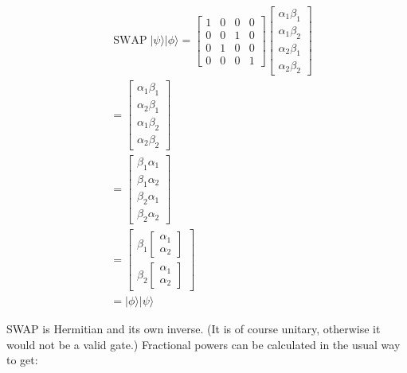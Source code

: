 \documentclass[main.tex]{subfiles}
\begin{document}
    $$
    \begin{aligned}
    &\operatorname{SWAP}|\psi\rangle|\phi\rangle=\left[\begin{array}{cccc}
    1 & 0 & 0 & 0 \\
    0 & 0 & 1 & 0 \\
    0 & 1 & 0 & 0 \\
    0 & 0 & 0 & 1
    \end{array}\right]\left[\begin{array}{l}
    \alpha_{1} \beta_{1} \\
    \alpha_{1} \beta_{2} \\
    \alpha_{2} \beta_{1} \\
    \alpha_{2} \beta_{2}
    \end{array}\right]\\
    &=\left[\begin{array}{c}
    \alpha_{1} \beta_{1} \\
    \alpha_{2} \beta_{1} \\
    \alpha_{1} \beta_{2} \\
    \alpha_{2} \beta_{2}
    \end{array}\right]\\
    &=\left[\begin{array}{l}
    \beta_{1} \alpha_{1} \\
    \beta_{1} \alpha_{2} \\
    \beta_{2} \alpha_{1} \\
    \beta_{2} \alpha_{2}
    \end{array}\right]\\
    &=\left[\begin{array}{l}
    \beta_{1}\left[\begin{array}{l}
    \alpha_{1} \\
    \alpha_{2}
    \end{array}\right] \\
    \beta_{2}\left[\begin{array}{l}
    \alpha_{1} \\
    \alpha_{2}
    \end{array}\right]
    \end{array}\right]\\
    &=|\phi\rangle|\psi\rangle
    \end{aligned}
    $$
    
    SWAP is Hermitian and its own inverse. (It is of course unitary, otherwise it would not be a valid gate.) Fractional powers can be calculated in the usual way to get:
    
\end{document}
